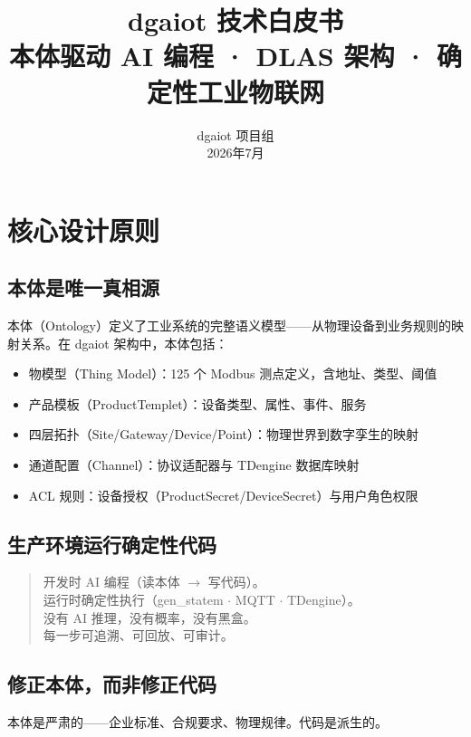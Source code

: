 \documentclass[12pt,a4paper]{ctexart}
\title{{\Huge\heiti dgaiot 技术白皮书}\\{\Large 本体驱动 AI 编程 · DLAS 架构 · 确定性工业物联网}}
\author{dgaiot 项目组\\\small 2026年7月}
\date{}
\begin{document}
\maketitle
\thispagestyle{empty}
\newpage
\tableofcontents
\newpage

\section{核心设计原则}

\subsection{本体是唯一真相源}

本体（Ontology）定义了工业系统的完整语义模型——从物理设备到业务规则的映射关系。在 dgaiot 架构中，本体包括：

\begin{itemize}[leftmargin=*]
  \item 物模型（Thing Model）：125 个 Modbus 测点定义，含地址、类型、阈值
  \item 产品模板（ProductTemplet）：设备类型、属性、事件、服务
  \item 四层拓扑（Site/Gateway/Device/Point）：物理世界到数字孪生的映射
  \item 通道配置（Channel）：协议适配器与 TDengine 数据库映射
  \item ACL 规则：设备授权（ProductSecret/DeviceSecret）与用户角色权限
\end{itemize}

\subsection{生产环境运行确定性代码}

\begin{quote}
开发时 AI 编程（读本体 $\rightarrow$ 写代码）。\\
运行时确定性执行（gen\_statem $\cdot$ MQTT $\cdot$ TDengine）。\\
没有 AI 推理，没有概率，没有黑盒。\\
每一步可追溯、可回放、可审计。
\end{quote}

\subsection{修正本体，而非修正代码}

本体是严肃的——企业标准、合规要求、物理规律。代码是派生的。
\end{document}

